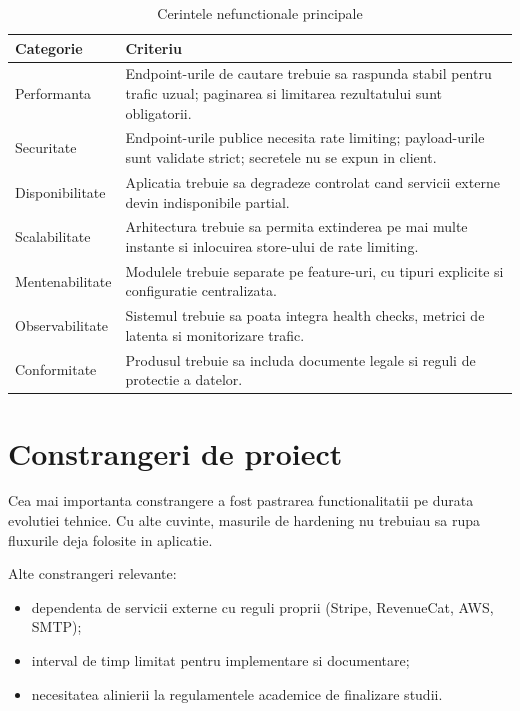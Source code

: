 \begin{table}[H]
\centering
\caption{Cerintele nefunctionale principale}
\begin{tabular}{p{} p{}}
\toprule
\textbf{Categorie} & \textbf{Criteriu} \\
\midrule
Performanta & Endpoint-urile de cautare trebuie sa raspunda stabil pentru trafic uzual; paginarea si limitarea rezultatului sunt obligatorii. \\
Securitate & Endpoint-urile publice necesita rate limiting; payload-urile sunt validate strict; secretele nu se expun in client. \\
Disponibilitate & Aplicatia trebuie sa degradeze controlat cand servicii externe devin indisponibile partial. \\
Scalabilitate & Arhitectura trebuie sa permita extinderea pe mai multe instante si inlocuirea store-ului de rate limiting. \\
Mentenabilitate & Modulele trebuie separate pe feature-uri, cu tipuri explicite si configuratie centralizata. \\
Observabilitate & Sistemul trebuie sa poata integra health checks, metrici de latenta si monitorizare trafic. \\
Conformitate & Produsul trebuie sa includa documente legale si reguli de protectie a datelor. \\
\bottomrule
\end{tabular}
\end{table}

\section{Constrangeri de proiect}

Cea mai importanta constrangere a fost pastrarea functionalitatii pe durata evolutiei tehnice. Cu alte cuvinte, masurile de hardening nu trebuiau sa rupa fluxurile deja folosite in aplicatie.

Alte constrangeri relevante:
\begin{itemize}[leftmargin=1.2cm]
    \item dependenta de servicii externe cu reguli proprii (Stripe, RevenueCat, AWS, SMTP);
    \item interval de timp limitat pentru implementare si documentare;
    \item necesitatea alinierii la regulamentele academice de finalizare studii.
\end{itemize}

